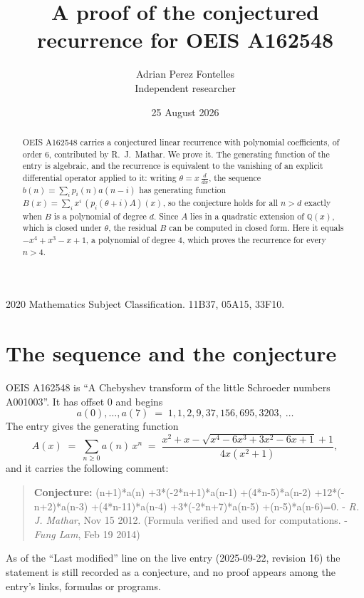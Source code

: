 \documentclass[11pt,a4paper]{article}
\title{A proof of the conjectured recurrence for OEIS A162548}
\author{Adrian Perez Fontelles\\ \small Independent researcher}
\date{25 August 2026}
\theoremstyle{plain}
\theoremstyle{definition}
\begin{document}
\maketitle

\begin{abstract}
OEIS A162548 carries a conjectured linear recurrence with polynomial coefficients, of
order 6, contributed by R.~J.~Mathar. We prove it. The generating function of the
entry is algebraic, and the recurrence is equivalent to the vanishing of an explicit
differential operator applied to it: writing $\theta=x\,\frac{d}{dx}$, the sequence
$b(n)=\sum_{i}p_{i}(n)a(n-i)$ has generating function
$B(x)=\sum_{i}x^{i}\,(p_{i}(\theta+i)A)(x)$, so the conjecture holds for all $n>d$ exactly
when $B$ is a polynomial of degree $d$. Since $A$ lies in a quadratic extension of
$\mathbb{Q}(x)$, which is closed under $\theta$, the residual $B$ can be computed in
closed form. Here it equals $- x^{4} + x^{3} - x + 1$, a polynomial of degree $4$, which proves
the recurrence for every $n>4$.
\end{abstract}

\noindent\small 2020 Mathematics Subject Classification. 11B37, 05A15, 33F10.\normalsize

\section{The sequence and the conjecture}

OEIS A162548 is ``A Chebyshev transform of the little Schroeder numbers A001003''. It has offset $0$ and begins
\[
a(0),\dots,a(7)\;=\;1, 1, 2, 9, 37, 156, 695, 3203,\ \dots
\]
The entry gives the generating function
\begin{equation}\label{eq:gf}
A(x)\;=\;\sum_{n\ge 0} a(n)\,x^{n}\;=\;\frac{x^{2} + x - \sqrt{x^{4} - 6 x^{3} + 3 x^{2} - 6 x + 1} + 1}{4 x \left(x^{2} + 1\right)} ,
\end{equation}
and it carries the following comment:
\begin{quote}\small
\textbf{Conjecture:}  (n+1)*a(n) +3*(-2*n+1)*a(n-1) +(4*n-5)*a(n-2) +12*(-n+2)*a(n-3) +(4*n-11)*a(n-4) +3*(-2*n+7)*a(n-5) +(n-5)*a(n-6)=0. - \emph{R. J. Mathar}, Nov 15 2012. (Formula verified and used for computations. - \emph{Fung Lam}, Feb 19 2014)
\end{quote}
As of the ``Last modified'' line on the live entry (2025-09-22, revision 16) the
statement is still recorded as a conjecture, and no proof appears among the entry's links,
formulas or programs.
\end{document}
